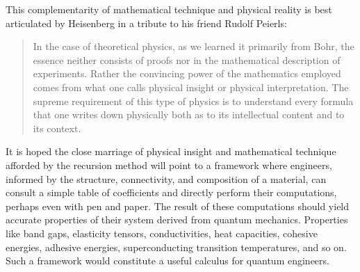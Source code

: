 This complementarity of mathematical technique and physical reality 
is best articulated by Heisenberg in a tribute to his friend Rudolf Peierls:
% 
\begin{quote}
In the case of theoretical physics, as we learned it primarily from
Bohr, the essence neither consists of proofs
nor in the mathematical description of experiments.
Rather the convincing power of the mathematics employed comes from
what one calls physical insight or physical interpretation. The supreme
requirement of this type of physics is to understand every formula that
one writes down physically both as to its intellectual content and to its context.
\end{quote}
% 
It is hoped the close marriage of physical insight and mathematical technique 
afforded by the recursion method will point to a framework where engineers, informed by the
structure, connectivity, and composition of a material, can consult a simple table of
coefficients and directly perform their computations, perhaps even with 
pen and paper. The result of these computations should yield accurate 
properties of their system derived from quantum mechanics.
Properties like band gaps, elasticity tensors, conductivities, 
heat capacities, cohesive energies, adhesive energies, superconducting transition temperatures, 
and so on. Such a framework would constitute a useful calculus for quantum engineers.

